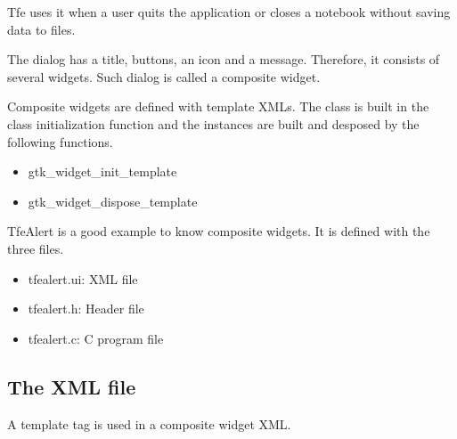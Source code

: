 Tfe uses it when a user quits the application or closes a notebook
without saving data to files.

The dialog has a title, buttons, an icon and a message. Therefore, it
consists of several widgets. Such dialog is called a composite widget.

Composite widgets are defined with template XMLs. The class is built in
the class initialization function and the instances are built and
desposed by the following functions.

\begin{itemize}
\tightlist
\item
  gtk\_widget\_init\_template
\item
  gtk\_widget\_dispose\_template
\end{itemize}

TfeAlert is a good example to know composite widgets. It is defined with
the three files.

\begin{itemize}
\tightlist
\item
  tfealert.ui: XML file
\item
  tfealert.h: Header file
\item
  tfealert.c: C program file
\end{itemize}

\subsection{The XML file}\label{the-xml-file}

A template tag is used in a composite widget XML.

